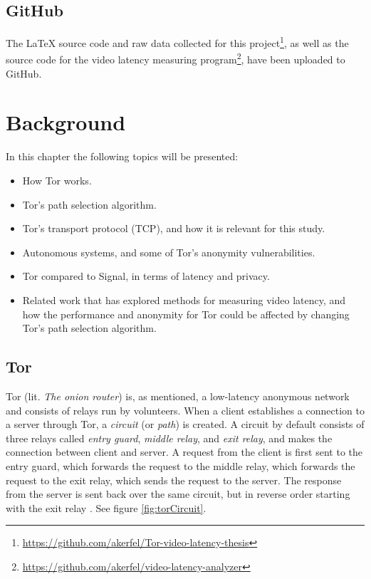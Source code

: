 \documentclass{kththesis}
\begin{document}
\section{GitHub}
The LaTeX source code and raw data collected for this project\footnote{\url{https://github.com/akerfel/Tor-video-latency-thesis}}, as well as the source code for the video latency measuring program\footnote{\url{https://github.com/akerfel/video-latency-analyzer}}, have been uploaded to GitHub.

\chapter{Background}
In this chapter the following topics will be presented:

\begin{itemize}
    \item How Tor works.
    \item Tor's path selection algorithm.
    \item Tor's transport protocol (TCP), and how it is relevant for this study.
    \item Autonomous systems, and some of Tor's anonymity vulnerabilities.
    \item Tor compared to Signal, in terms of latency and privacy.
    \item Related work that has explored methods for measuring video latency, and how the performance and anonymity for Tor could be affected by changing Tor's path selection algorithm.
\end{itemize}

\section{Tor}
Tor (lit. \emph{The onion router}) is, as mentioned, a low-latency anonymous network and consists of relays run by volunteers. When a client establishes a connection to a server through Tor, a \emph{circuit} (or \emph{path}) is created. A circuit by default consists of three relays called \emph{entry guard}, \emph{middle relay}, and \emph{exit relay}, and makes the connection between client and server. A request from the client is first sent to the entry guard, which forwards the request to the middle relay, which forwards the request to the exit relay, which sends the request to the server. The response from the server is sent back over the same circuit, but in reverse order starting with the exit relay \parencite{UnderstandingTor}. See figure \ref{fig:torCircuit}.
\end{document}
